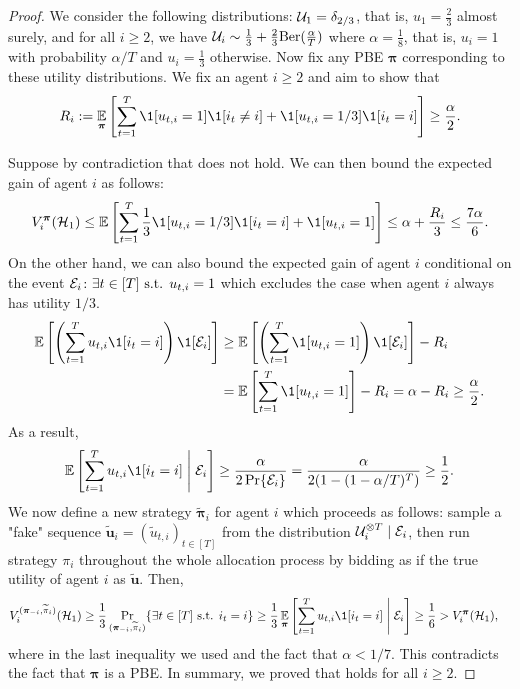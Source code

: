 \begin{proof}
    We consider the following distributions: $\mathcal{U}_1 = \delta_{2/3}$, that is, $u_1=\frac{2}{3}$ almost surely, and for all $i\geq 2$, we have $\mathcal{U}_i \sim \frac{1}{3} + \frac{2}{3}\text{Ber}(\frac{\alpha}{T})$ where $\alpha=\frac{1}{8}$, that is, $u_i=1$ with probability $\alpha/T$ and $u_i=\frac{1}{3}$ otherwise.
    Now fix any PBE $\bm\pi$ corresponding to these utility distributions. We fix an agent $i\geq 2$ and aim to show that
    \begin{equation}\label{eq:bound_error_i}
        R_i:=\E_{\bm\pi}\sqb{\sum_{t=1}^T \1[u_{t,i}=1]\1[i_t\neq i] + \1[u_{t,i}=1/3]\1[i_t=i]} \geq \frac{\alpha}{2}.
    \end{equation}
    
    Suppose by contradiction that  does not hold. We can then bound the expected gain of agent $i$ as follows:
    \begin{equation}\label{eq:upper_bound_gain_i}
        V_i^{\bm\pi}(\mH_1) \leq \E\sqb{\sum_{t=1}^T \frac{1}{3}\1[u_{t,i}=1/3]\1[i_t=i] + \1[u_{t,i}=1]} \leq \alpha+\frac{R_i}{3}\leq \frac{7\alpha}{6}.
    \end{equation}
    On the other hand, we can also bound the expected gain of agent $i$ conditional on the event $\mathcal{E}_i\colon \exists t\in[T]\text{ s.t. } u_{t,i}=1$ which excludes the case when agent $i$ always has utility $1/3$.
    \begin{align*}
        \E\sqb{\paren{\sum_{t=1}^T u_{t,i}\1[i_t=i]}\1[\mE_i]} &\geq \E\sqb{\paren{\sum_{t=1}^T \1[u_{t,i}=1]}\1[\mE_i]}- R_i\\
        &= \E\sqb{\sum_{t=1}^T \1[u_{t,i}=1]}- R_i =\alpha-R_i \geq \frac{\alpha}{2}.
    \end{align*}
    As a result,
    \begin{equation*}
        \E\sqb{\sum_{t=1}^T u_{t,i}\1[i_t=i] \middle \vert \mE_i} \geq \frac{\alpha}{2\Pr\{\mE_i\}} = \frac{\alpha}{2(1-(1-\alpha/T)^T)}\geq \frac{1}{2}.
    \end{equation*}
    We now define a new strategy $\tilde{\bm \pi}_i$ for agent $i$ which proceeds as follows: sample a "fake" sequence $\tilde{\bm u}_i=(\tilde u_{t,i})_{t\in[T]}$ from the distribution $\mathcal{U}_i^{\otimes T}\mid\mathcal{E}_i$, then run strategy $\pi_i$ throughout the whole allocation process by bidding as if the true utility of agent $i$ as $\tilde{\bm u}$. Then,
    \begin{align*}
        V_i^{(\bm\pi_{-i},\tilde\pi_i)}(\mH_1) &\geq \frac{1}{3}\Pr_{(\bm\pi_{-i},\tilde\pi_i)}\{\exists t\in[T]\text{ s.t. }i_t=i\} \geq \frac{1}{3} \E_{\bm \pi}\sqb{\sum_{t=1}^T u_{t,i}\1[i_t=i] \middle \vert \mE_i} \geq \frac{1}{6} > V_i^{\bm\pi}(\mH_1),
    \end{align*}
    where in the last inequality we used  and the fact that $\alpha<1/7$.
    This contradicts the fact that $\bm\pi$ is a PBE. In summary, we proved that  holds for all $i\geq 2$.


\end{proof}
